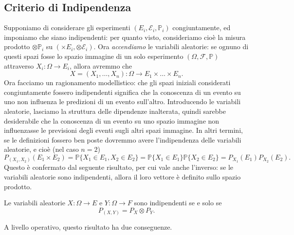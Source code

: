 \subsection{Criterio di Indipendenza}

Supponiamo di considerare gli esperimenti $(E_i, \mathcal{E}_i, \mathbb{P}_i)$ congiuntamente, ed imponiamo che siano indipendenti: per quanto visto, consideriamo cioè la misura prodotto $\otimes \mathbb{P}_i$ su $(\times E_i, \otimes \mathcal{E}_i)$.
Ora \textit{accendiamo} le variabili aleatorie: se ognuno di questi spazi fosse lo spazio immagine di un solo esperimento $(\Omega,\mathcal{F},\mathbb{P})$ attraverso $X_i : \Omega \to E_i$, allora avremmo che
\[
	X=(X_1,\dots,X_n) : \Omega \to E_1 \times \dots \times E_n.
\]
Ora facciamo un ragionamento modellistico: che gli spazi iniziali considerati congiuntamente fossero indipendenti significa che la conoscenza di un evento su uno non influenza le predizioni di un evento sull'altro. 
Introducendo le variabili aleatorie, lasciamo la struttura delle dipendenze inalterata, quindi sarebbe desiderabile che la conoscenza di un evento su uno spazio immagine non influenzasse le previsioni degli eventi sugli altri spazi immagine. 
In altri termini, se le definizioni fossero ben poste dovremmo avere l'indipendenza delle variabili aleatorie, e cioè (nel caso $n=2$)
\[
	P_{(X_1,X_2)} (E_1 \times E_2) = \mathbb{P} \{X_1 \in E_1, X_2 \in E_2 \} = \mathbb{P} \{X_1 \in E_1\} \mathbb{P} \{X_2 \in E_2 \} = P_{X_1} (E_1) P_{X_2} (E_2).
\]
Questo è confermato dal seguente risultato, per cui vale anche l'inverso: se le variabili aleatorie sono indipendenti, allora il loro vettore è definito sullo spazio prodotto.
\begin{my_lemma}
	\label{equival_indip}
	Le variabili aleatorie $X:\Omega \to E$ e $Y:\Omega \to F$ sono indipendenti se e solo se 
	\begin{equation}
		\label{crit}
		P_{(X,Y)} = P_X \otimes P_Y.	
	\end{equation}
\end{my_lemma}
A livello operativo, questo risultato ha due conseguenze. 

